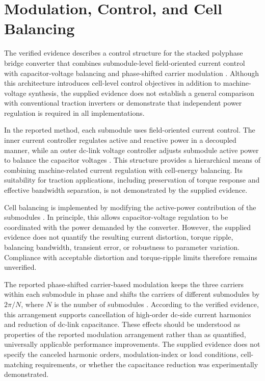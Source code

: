 \section{Modulation, Control, and Cell Balancing}

The verified evidence describes a control structure for the stacked polyphase bridge converter that combines submodule-level field-oriented current control with capacitor-voltage balancing and phase-shifted carrier modulation \cite{Jin2017}. Although this architecture introduces cell-level control objectives in addition to machine-voltage synthesis, the supplied evidence does not establish a general comparison with conventional traction inverters or demonstrate that independent power regulation is required in all implementations. %

In the reported method, each submodule uses field-oriented current control. The inner current controller regulates active and reactive power in a decoupled manner, while an outer dc-link voltage controller adjusts submodule active power to balance the capacitor voltages \cite{Jin2017}. This structure provides a hierarchical means of combining machine-related current regulation with cell-energy balancing. Its suitability for traction applications, including preservation of torque response and effective bandwidth separation, is not demonstrated by the supplied evidence. %

Cell balancing is implemented by modifying the active-power contribution of the submodules \cite{Jin2017}. In principle, this allows capacitor-voltage regulation to be coordinated with the power demanded by the converter. However, the supplied evidence does not quantify the resulting current distortion, torque ripple, balancing bandwidth, transient error, or robustness to parameter variation. Compliance with acceptable distortion and torque-ripple limits therefore remains unverified. %

The reported phase-shifted carrier-based modulation keeps the three carriers within each submodule in phase and shifts the carriers of different submodules by \(2\pi/N\), where \(N\) is the number of submodules \cite{Jin2017}. According to the verified evidence, this arrangement supports cancellation of high-order dc-side current harmonics and reduction of dc-link capacitance. These effects should be understood as properties of the reported modulation arrangement rather than as quantified, universally applicable performance improvements. The supplied evidence does not specify the canceled harmonic orders, modulation-index or load conditions, cell-matching requirements, or whether the capacitance reduction was experimentally demonstrated. %

